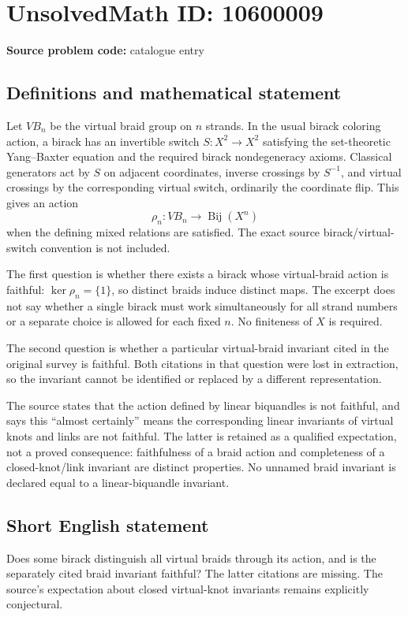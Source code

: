 \documentclass[11pt]{article}
\begin{document}
\section*{UnsolvedMath ID: 10600009}
\textbf{Source problem code:} catalogue entry
\subsection{Definitions and mathematical statement}
Let \(VB_n\) be the virtual braid group on \(n\) strands. In the usual birack coloring action, a birack has an invertible switch \(S:X^2\to X^2\) satisfying the set-theoretic Yang--Baxter equation and the required birack nondegeneracy axioms. Classical generators act by \(S\) on adjacent coordinates, inverse crossings by \(S^{-1}\), and virtual crossings by the corresponding virtual switch, ordinarily the coordinate flip. This gives an action
\[
 \rho_n:VB_n\longrightarrow\operatorname{Bij}(X^n)
\]
when the defining mixed relations are satisfied. The exact source birack/virtual-switch convention is not included.

The first question is whether there exists a birack whose virtual-braid action is faithful: \(\ker\rho_n=\{1\}\), so distinct braids induce distinct maps. The excerpt does not say whether a single birack must work simultaneously for all strand numbers or a separate choice is allowed for each fixed \(n\). No finiteness of \(X\) is required.

The second question is whether a particular virtual-braid invariant cited in the original survey is faithful. Both citations in that question were lost in extraction, so the invariant cannot be identified or replaced by a different representation.

The source states that the action defined by linear biquandles is not faithful, and says this ``almost certainly'' means the corresponding linear invariants of virtual knots and links are not faithful. The latter is retained as a qualified expectation, not a proved consequence: faithfulness of a braid action and completeness of a closed-knot/link invariant are distinct properties. No unnamed braid invariant is declared equal to a linear-biquandle invariant.
\subsection{Short English statement}
Does some birack distinguish all virtual braids through its action, and is the separately cited braid invariant faithful? The latter citations are missing. The source's expectation about closed virtual-knot invariants remains explicitly conjectural.
\end{document}

